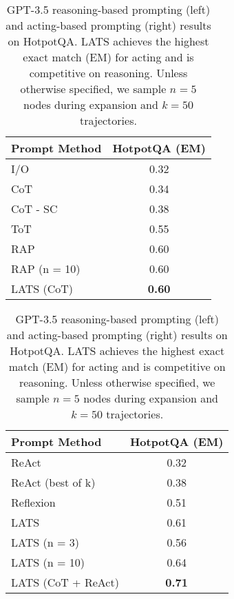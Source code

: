 \documentclass{article} \usepackage{iclr2024_conference,times}
\begin{document}
\begin{table}[t]
    \centering
    \begin{minipage}{0.5\linewidth}
        \centering
        \begin{tabular}{l|c}
        \toprule
            \textbf{Prompt Method} & \textbf{HotpotQA (EM)} \\
        \midrule
            I/O & 0.32 \\
            CoT {\scriptsize~\citep{wei2022chain}} & 0.34 \\ 
            CoT - SC {\scriptsize~\citep{wang2022self}} & 0.38 \\
            ToT {\scriptsize~\citep{yao2023tree}} & 0.55 \\
            RAP {\scriptsize~\citep{hao2023reasoning}} & 0.60 \\
            RAP (n = 10) & 0.60 \\
            LATS (CoT) & \textbf{0.60} \\
        \bottomrule
        \end{tabular}
    \end{minipage}\begin{minipage}{0.5\linewidth}
        \centering
        \begin{tabular}{l|c}
        \toprule
            \textbf{Prompt Method} & \textbf{HotpotQA (EM)} \\
        \midrule
            ReAct {\scriptsize~\citep{yao2023react}} & 0.32 \\
            ReAct (best of k) & 0.38 \\
            Reflexion {\scriptsize~\citep{shinn2023reflexion}} & 0.51 \\
            LATS & 0.61 \\
            LATS (n = 3) & 0.56 \\
            LATS (n = 10) & 0.64 \\
            LATS (CoT + ReAct) & \textbf{0.71} \\
        \bottomrule
        \end{tabular}
    \end{minipage}
    \caption{GPT-3.5 reasoning-based prompting (left) and acting-based prompting (right) results on HotpotQA. LATS achieves the highest exact match (EM) for acting and is competitive on reasoning. Unless otherwise specified, we sample $n=5$ nodes during expansion and $k = 50$ trajectories.}
    \label{table:hotpot}
\end{table}
\end{document}
